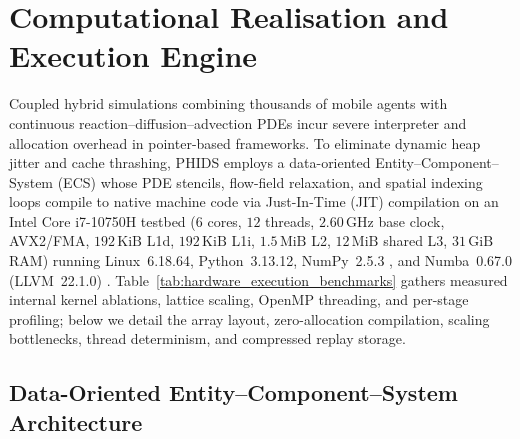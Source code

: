 
\section{Computational Realisation and Execution Engine}
\label{sec:computational_realisation}

Coupled hybrid simulations combining thousands of mobile agents with continuous reaction--diffusion--advection PDEs incur severe interpreter and allocation overhead in pointer-based frameworks. To eliminate dynamic heap jitter and cache thrashing, PHIDS employs a data-oriented Entity--Component--System (ECS) whose PDE stencils, flow-field relaxation, and spatial indexing loops compile to native machine code via Just-In-Time (JIT) compilation on an Intel Core i7-10750H testbed ($6$ cores, $12$ threads, $2.60\,\text{GHz}$ base clock, AVX2/FMA, $192\,\text{KiB}$ L1d, $192\,\text{KiB}$ L1i, $1.5\,\text{MiB}$ L2, $12\,\text{MiB}$ shared L3, $31\,\text{GiB}$ RAM) running Linux~6.18.64, Python~3.13.12, NumPy~2.5.3 \cite{harris2020array}, and Numba~0.67.0 (LLVM~22.1.0) \cite{lam2015numba}. Table~\ref{tab:hardware_execution_benchmarks} gathers measured internal kernel ablations, lattice scaling, OpenMP threading, and per-stage profiling; below we detail the array layout, zero-allocation compilation, scaling bottlenecks, thread determinism, and compressed replay storage.



\subsection{Data-Oriented Entity--Component--System Architecture}
\label{subsec:data_oriented_ecs}

